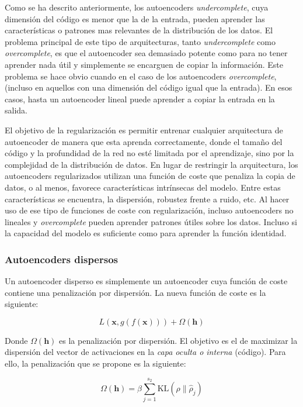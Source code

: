 \documentclass[
  12pt,
  a4paperpaper,
]{report}
\begin{document}
Como se ha descrito anteriormente, los autoencoders
\emph{undercomplete}, cuya dimensión del código es menor que la de la
entrada, pueden aprender las características o patrones mas relevantes
de la distribución de los datos. El problema principal de este tipo de
arquitecturas, tanto \emph{undercomplete} como \emph{overcomplete}, es
que el autoencoder sea demasiado potente como para no tener aprender
nada útil y simplemente se encarguen de copiar la información. Este
problema se hace obvio cuando en el caso de los autoencoders
\emph{overcomplete}, (incluso en aquellos con una dimensión del código
igual que la entrada). En esos casos, hasta un autoencoder lineal puede
aprender a copiar la entrada en la salida.

El objetivo de la regularización es permitir entrenar cualquier
arquitectura de autoencoder de manera que esta aprenda correctamente,
donde el tamaño del código y la profundidad de la red no esté limitada
por el aprendizaje, sino por la complejidad de la distribución de datos.
En lugar de restringir la arquitectura, los autoencoders regularizados
utilizan una función de coste que penaliza la copia de datos, o al
menos, favorece características intrínsecas del modelo. Entre estas
características se encuentra, la dispersión, robustez frente a ruido,
etc. Al hacer uso de ese tipo de funciones de coste con regularización,
incluso autoencoders no lineales y \emph{overcomplete} pueden aprender
patrones útiles sobre los datos. Incluso si la capacidad del modelo es
suficiente como para aprender la función identidad.

\hypertarget{autoencoders-dispersos}{%
\subsubsection{Autoencoders dispersos}\label{autoencoders-dispersos}}

Un autoencoder disperso es simplemente un autoencoder cuya función de
coste contiene una penalización por dispersión. La nueva función de
coste es la siguiente:

\[L(\boldsymbol{x}, g(f(\boldsymbol{x})))+\Omega(\boldsymbol{h})\]

Donde \(\Omega(\boldsymbol{h})\) es la penalización por dispersión. El
objetivo es el de maximizar la dispersión del vector de activaciones en
la \emph{capa oculta o interna} (código). Para ello, la penalización que
se propone es la siguiente:

\[\Omega(\boldsymbol{h}) = \beta \sum_{j=1}^{s_{2}} \mathrm{KL}\left(\rho \| \hat{\rho}_{j}\right)\]
\end{document}
